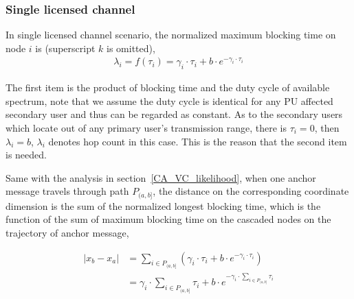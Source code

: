 \subsubsection*{Single licensed channel}
In single licensed channel scenario, the normalized maximum blocking time on node $i$ is (superscript $k$ is omitted), 
\begin{equation}
\label{eq:SingleChannel_blockingtime}
\begin{aligned}
\lambda_i = f(\tau_i) = \gamma_i\cdot \tau_i + b\cdot e^{-\gamma_i\cdot \tau_i}
\end{aligned}
\end{equation}


The first item is the product of blocking time and the duty cycle of available spectrum, note that we assume the duty cycle is identical for any PU affected secondary user and thus can be regarded as constant.
As to the secondary users which locate out of any primary user's transmission range, there is $\tau_i=0$, then $\lambda_i=b$, $\lambda_i$ denotes hop count in this case.
This is the reason that the second item is needed.

Same with the analysis in section~\ref{CA_VC_likelihood}, when one anchor message travels through path $P_{(a,b]}$, the distance on the corresponding coordinate dimension is the sum of the normalized longest blocking time, which is the function of the sum of maximum blocking time on the cascaded nodes on the trajectory of anchor message,

\begin{equation}
\label{distance2}
\begin{split}
|x_b-x_a| & =  \sum_{i\in P_{(a,b]}} (\gamma_i\cdot \tau_i + b\cdot e^{-\gamma_i\cdot \tau_i}) \\
		  & = \gamma_i\cdot \sum_{i\in P_{(a,b]}}\tau_i + b\cdot e^{-\gamma_i\cdot \sum_{i\in P_{(a,b]}}\tau_i}
\end{split}
\end{equation}

